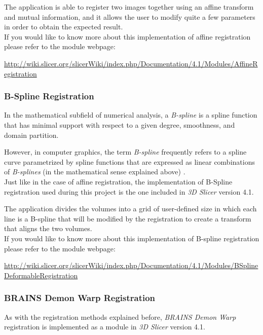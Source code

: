 The application is able to register two images together using an
affine transform and mutual information, and it allows the user to
modify quite a few parameters
in order to obtain the expected result.\\

If you would like to know more about this implementation of affine
registration please refer to the module webpage:

\url{http://wiki.slicer.org/slicerWiki/index.php/Documentation/4.1/Modules/AffineRegistration}

\subsubsection{B-Spline Registration}
In the mathematical subfield of numerical analysis, a
\textit{B-spline} is a spline function that has minimal support with
respect to a given degree, smoothness, and domain partition.

However, in computer graphics, the term \textit{B-spline} frequently
refers to a spline curve parametrized by spline functions that are
expressed as linear combinations of \textit{B-splines} (in the
mathematical sense explained above) \cite{bspline}.\\

Just like in the case of affine registration, the implementation of
B-Spline registration used during this project is the one included in
\textit{3D Slicer} version 4.1. 

The application divides the volumes into a grid of user-defined size
in which each line is a B-spline that will be modified by the
registration to create a transform that aligns the two volumes.\\

If you would like to know more about this implementation of B-spline
registration please refer to the module webpage:

\url{http://wiki.slicer.org/slicerWiki/index.php/Documentation/4.1/Modules/BSplineDeformableRegistration}


\subsubsection{BRAINS Demon Warp Registration}
\label{sec:demon_warp}
As with the registration methods explained before, \textit{BRAINS
  Demon Warp} registration is implemented as a module in \textit{3D
  Slicer} version
4.1.\\

